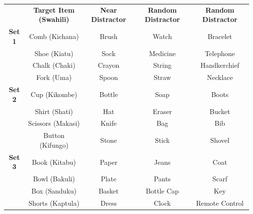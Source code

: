 \documentclass[10pt, letterpaper]{article}
\begin{document}
\begin{table}[]
\centering
\begin{tabular}{@{}ccccc@{}}
\multicolumn{1}{l}{} & \textbf{Target Item (Swahili)} & \textbf{Near Distractor} & \textbf{Random Distractor} & \textbf{Random Distractor} \\
\rowcolor[HTML]{C0C0C0}
\textbf{Set 1}       & Comb (Kichana)                 & Brush                    & Watch                      & Bracelet                   \\
\rowcolor[HTML]{C0C0C0}
\textbf{}            & Shoe (Kiatu)                   & Sock                     & Medicine                   & Telephone                  \\
\rowcolor[HTML]{C0C0C0}
\textbf{}            & Chalk (Chaki)                  & Crayon                   & String                     & Handkerchief               \\
\rowcolor[HTML]{C0C0C0}
\textbf{}            & Fork (Uma)                     & Spoon                    & Straw                      & Necklace                   \\
\textbf{Set 2}       & Cup (Kikombe)                  & Bottle                   & Soap                       & Boots                      \\
\textbf{}            & Shirt (Shati)                  & Hat                      & Eraser                     & Bucket                     \\
\textbf{}            & Scissors (Makasi)              & Knife                    & Bag                        & Bib                        \\
\textbf{}            & Button (Kifungo)               & Stone                    & Stick                      & Shovel                     \\
\rowcolor[HTML]{C0C0C0}
\textbf{Set 3}       & Book (Kitabu)                  & Paper                    & Jeans                      & Coat                       \\
\rowcolor[HTML]{C0C0C0}
\textbf{}            & Bowl (Bakuli)                  & Plate                    & Pants                      & Scarf                      \\
\rowcolor[HTML]{C0C0C0}
                     & Box (Sanduku)                  & Basket                   & Bottle Cap                 & Key                        \\
\rowcolor[HTML]{C0C0C0}
                     & Shorts (Kaptula)               & Dress                    & Clock                      & Remote Control             \\

\end{tabular}
\end{table}
\end{document}

